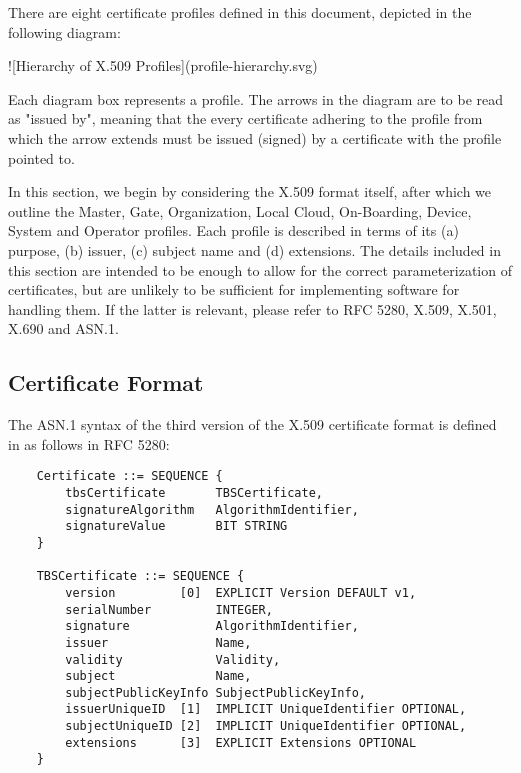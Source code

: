 %
%

There are eight certificate profiles defined in this document, depicted in the following diagram:

![Hierarchy of X.509 Profiles](profile-hierarchy.svg)

Each diagram box represents a profile.
The arrows in the diagram are to be read as "issued by", meaning that the every certificate adhering to the profile from which the arrow extends must be issued (signed) by a certificate with the profile pointed to.

In this section, we begin by considering the X.509 format itself, after which we outline the Master, Gate, Organization, Local Cloud, On-Boarding, Device, System and Operator profiles.
Each profile is described in terms of its (a) purpose, (b) issuer, (c) subject name and (d) extensions.
The details included in this section are intended to be enough to allow for the correct parameterization of certificates, but are unlikely to be sufficient for implementing software for handling them.
If the latter is relevant, please refer to RFC 5280, X.509, X.501, X.690 and ASN.1.

\subsection{Certificate Format}

The ASN.1 syntax of the third version of the X.509 certificate format is defined in as follows in RFC 5280:

\begin{verbatim}
    Certificate ::= SEQUENCE {
        tbsCertificate       TBSCertificate,
        signatureAlgorithm   AlgorithmIdentifier,
        signatureValue       BIT STRING
    }

    TBSCertificate ::= SEQUENCE {
        version         [0]  EXPLICIT Version DEFAULT v1,
        serialNumber         INTEGER,
        signature            AlgorithmIdentifier,
        issuer               Name,
        validity             Validity,
        subject              Name,
        subjectPublicKeyInfo SubjectPublicKeyInfo,
        issuerUniqueID  [1]  IMPLICIT UniqueIdentifier OPTIONAL,
        subjectUniqueID [2]  IMPLICIT UniqueIdentifier OPTIONAL,
        extensions      [3]  EXPLICIT Extensions OPTIONAL
    }
\end{verbatim}

